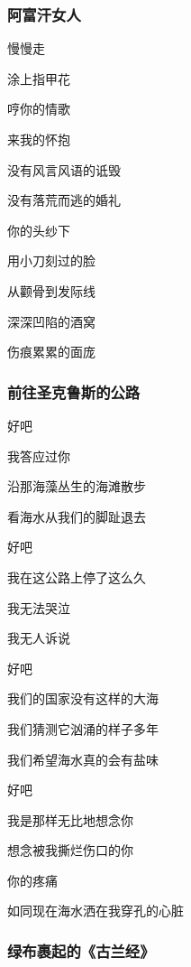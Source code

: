 \documentclass[openany,scheme = chinese, linespread = 1.5]{ctexbook}
\begin{document}
\subsubsection*{阿富汗女人}

\begin{center}
慢慢走

涂上指甲花

哼你的情歌

来我的怀抱

没有风言风语的诋毁

没有落荒而逃的婚礼

你的头纱下

用小刀刻过的脸

从颧骨到发际线

深深凹陷的酒窝

伤痕累累的面庞
\end{center}

\subsubsection*{前往圣克鲁斯的公路}

\begin{center}
好吧

我答应过你

沿那海藻丛生的海滩散步

看海水从我们的脚趾退去

好吧

我在这公路上停了这么久

我无法哭泣

我无人诉说

好吧

我们的国家没有这样的大海

我们猜测它汹涌的样子多年

我们希望海水真的会有盐味

好吧

我是那样无比地想念你

想念被我撕烂伤口的你

你的疼痛

如同现在海水洒在我穿孔的心脏
\end{center}

\subsubsection*{绿布裹起的《古兰经》}
\end{document}
